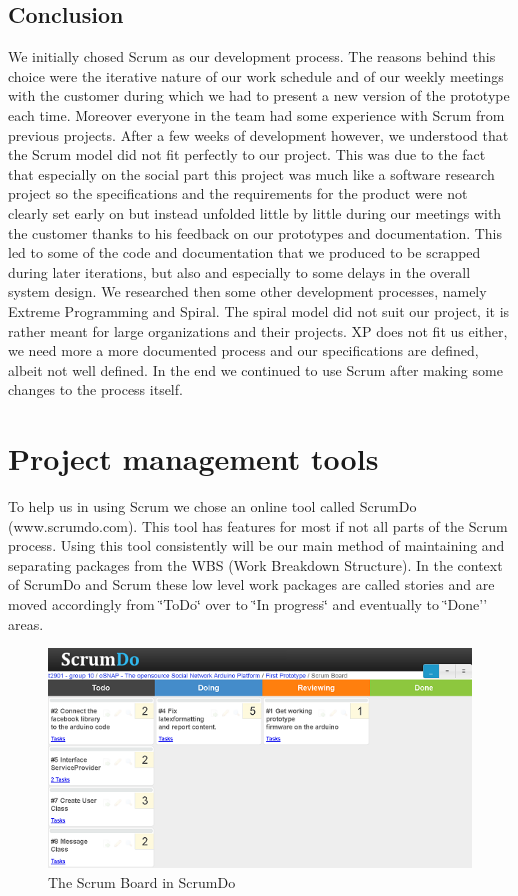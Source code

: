\subsection{Conclusion}
We initially chosed Scrum as our development process. The reasons behind this choice were the iterative nature
of our work schedule and of our weekly meetings with the customer during which we had to present a new version
of the prototype each time. Moreover everyone in the team had some experience with Scrum from previous projects.
After a few weeks of development however, we understood that the Scrum model did not fit perfectly to our project.
This was due to the fact that especially on the social part this project was much like a software research project
so the specifications and the requirements for the product were not clearly set early on but instead unfolded little by
little during our meetings with the customer thanks to his feedback on our prototypes and documentation.
This led to some of the code and documentation that we produced to be scrapped during later iterations,
but also and especially to some delays in the overall system design. We researched then some other development processes,
namely Extreme Programming and Spiral. The spiral model did not suit our project, it is rather meant
for large organizations and their projects. XP does not fit us either, we need more a more
documented process and our specifications are defined, albeit not well defined.
In the end we continued to use Scrum after making some changes to the process itself.

\section{Project management tools}

To help us in using Scrum we chose an online tool called ScrumDo (www.scrumdo.com).
This tool has features for most if not all parts of the Scrum process. Using this tool
consistently will be our main method of maintaining and separating packages from
the WBS (Work Breakdown Structure). In the context of ScrumDo and
Scrum these low level work packages are called stories and are moved
accordingly from \char`\"{}ToDo\char`\"{} over to \char`\"{}In progress\char`\"{}
and eventually to \char`\"{}Done'' areas.
	
\begin{figure}[h!]
\centering \includegraphics{img/mgmt-scrumdo} \caption{The Scrum Board in ScrumDo}
\label{fig:mgmt-scrumdo}
\end{figure}


